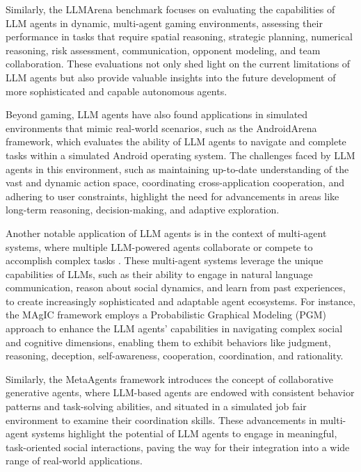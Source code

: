 \documentclass[11pt]{article}
\begin{document}
Similarly, the LLMArena \cite{ref231} benchmark focuses on evaluating the capabilities of LLM agents in dynamic, multi-agent gaming environments, assessing their performance in tasks that require spatial reasoning, strategic planning, numerical reasoning, risk assessment, communication, opponent modeling, and team collaboration. These evaluations not only shed light on the current limitations of LLM agents but also provide valuable insights into the future development of more sophisticated and capable autonomous agents.

Beyond gaming, LLM agents have also found applications in simulated environments that mimic real-world scenarios, such as the AndroidArena \cite{ref233} framework, which evaluates the ability of LLM agents to navigate and complete tasks within a simulated Android operating system. The challenges faced by LLM agents in this environment, such as maintaining up-to-date understanding of the vast and dynamic action space, coordinating cross-application cooperation, and adhering to user constraints, highlight the need for advancements in areas like long-term reasoning, decision-making, and adaptive exploration.

Another notable application of LLM agents is in the context of multi-agent systems, where multiple LLM-powered agents collaborate or compete to accomplish complex tasks \cite{ref234,ref235}. These multi-agent systems leverage the unique capabilities of LLMs, such as their ability to engage in natural language communication, reason about social dynamics, and learn from past experiences, to create increasingly sophisticated and adaptable agent ecosystems. For instance, the MAgIC \cite{ref234} framework employs a Probabilistic Graphical Modeling (PGM) approach to enhance the LLM agents' capabilities in navigating complex social and cognitive dimensions, enabling them to exhibit behaviors like judgment, reasoning, deception, self-awareness, cooperation, coordination, and rationality.

Similarly, the MetaAgents \cite{ref235} framework introduces the concept of collaborative generative agents, where LLM-based agents are endowed with consistent behavior patterns and task-solving abilities, and situated in a simulated job fair environment to examine their coordination skills. These advancements in multi-agent systems highlight the potential of LLM agents to engage in meaningful, task-oriented social interactions, paving the way for their integration into a wide range of real-world applications.
\end{document}
